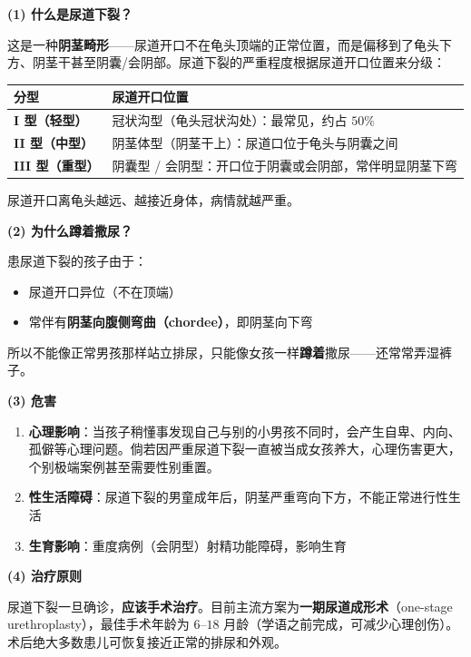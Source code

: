 \documentclass[12pt,a4paper,twoside]{ctexbook}
\begin{document}
\vspace{0.5em}
\noindent\textbf{(1) 什么是尿道下裂？}

这是一种\textbf{阴茎畸形}——尿道开口不在龟头顶端的正常位置，而是偏移到了龟头下方、阴茎干甚至阴囊/会阴部。尿道下裂的严重程度根据尿道开口位置来分级：

\begin{tabular}{|p{4cm}|p{9cm}|}
\hline
\textbf{分型} & \textbf{尿道开口位置} \\
\hline
\textbf{I 型（轻型）} & 冠状沟型（龟头冠状沟处）：最常见，约占 $50\%$ \\
\hline
\textbf{II 型（中型）} & 阴茎体型（阴茎干上）：尿道口位于龟头与阴囊之间 \\
\hline
\textbf{III 型（重型）} & 阴囊型 / 会阴型：开口位于阴囊或会阴部，常伴明显阴茎下弯 \\
\hline
\end{tabular}

尿道开口离龟头越远、越接近身体，病情就越严重。

\vspace{0.3em}
\noindent\textbf{(2) 为什么蹲着撒尿？}

患尿道下裂的孩子由于：
\begin{itemize}
	\item 尿道开口异位（不在顶端）
	\item 常伴有\textbf{阴茎向腹侧弯曲（chordee）}，即阴茎向下弯
\end{itemize}
所以不能像正常男孩那样站立排尿，只能像女孩一样\textbf{蹲着}撒尿——还常常弄湿裤子。

\vspace{0.3em}
\noindent\textbf{(3) 危害}

\begin{enumerate}
	\item \textbf{心理影响}：当孩子稍懂事发现自己与别的小男孩不同时，会产生自卑、内向、孤僻等心理问题。倘若因严重尿道下裂一直被当成女孩养大，心理伤害更大，个别极端案例甚至需要性别重置。
	\item \textbf{性生活障碍}：尿道下裂的男童成年后，阴茎严重弯向下方，不能正常进行性生活
	\item \textbf{生育影响}：重度病例（会阴型）射精功能障碍，影响生育
\end{enumerate}

\vspace{0.3em}
\noindent\textbf{(4) 治疗原则}

尿道下裂一旦确诊，\textbf{应该手术治疗}。目前主流方案为\textbf{一期尿道成形术}（one-stage urethroplasty），最佳手术年龄为 $6$--$18$ 月龄（学语之前完成，可减少心理创伤）。术后绝大多数患儿可恢复接近正常的排尿和外观。
\end{document}
